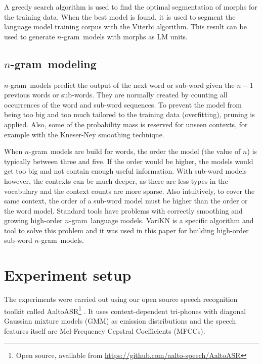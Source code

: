 \documentclass[b5paper]{article}
\newcommand{\note}[1]{{\textcolor{blue}{#1}}}
\newcommand{\ngram}{$n$-gram}
\begin{document}
A greedy search algorithm is used to find the optimal segmentation of morphs for the training data.  When the best model is found, it is used to segment the language model training corpus with the Viterbi algorithm. This result can be used to generate \ngram\ models with morphs as LM units.



\subsection{\ngram\ modeling}

\ngram\ models predict the output of the next word or sub-word given the $n-1$ previous words or sub-words. They are normally created by counting all occurrences of the word and sub-word sequences. To prevent the model from being too big and too much tailored to the training data (overfitting), pruning is applied. Also, some of the probability mass is reserved for unseen contexts, for example with the Kneser-Ney smoothing technique\cite{chen1996empirical}.

When \ngram\ models are build for words, the order the model (the value of $n$) is typically between three and five. If the order would be higher, the models would get too big and not contain enough useful information. With sub-word models however, the contexts can be much deeper, as there are less types in the vocabulary and the context counts are more sparse. Also intuitively, to cover the same context, the order of a sub-word model must be higher than the order or the word model.
Standard tools have problems with correctly smoothing and growing high-order \ngram\ language models.  VariKN  \cite{siivola2007growing} is a specific algorithm and tool to solve this problem and it was used in this paper for building high-order sub-word  \ngram\ models. 



\section{Experiment setup}



The experiments were carried out using our open source speech recognition toolkit called AaltoASR\footnote{Open source, available from \url{https://github.com/aalto-speech/AaltoASR}} \cite{hirsimaki2009importance}\cite{pylkkonen2005efficient}. It uses context-dependent tri-phones with diagonal Gaussian mixture models (GMM) as emission distributions and the speech features itself are Mel-Frequency Cepstral Coefficients (MFCCs). 
\end{document}
